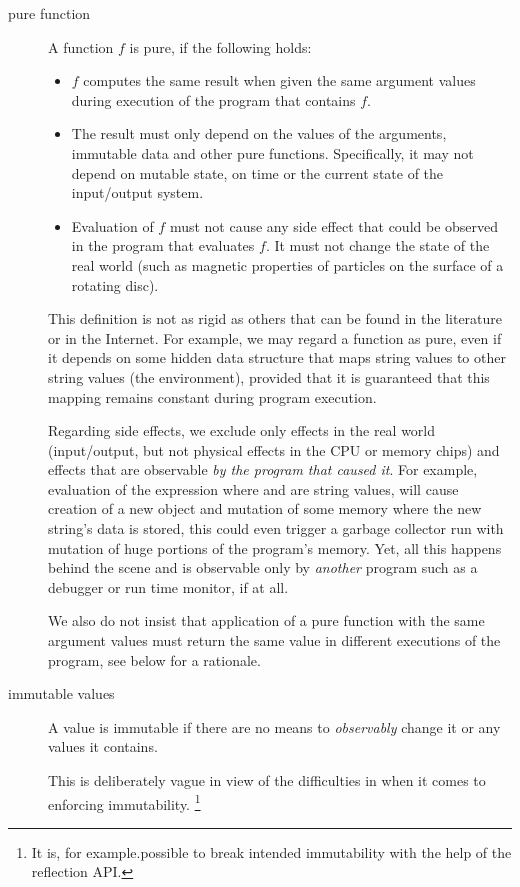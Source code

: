\begin{description}
\item[pure function] A function $f$ is pure, if the following holds:
\begin{itemize}
\item $f$ computes the same result when given the same argument values during execution of the program that contains $f$.
\item The result must only depend on the values of the arguments, immutable data and other pure functions. Specifically, it may not depend on mutable state, on time or the current state of the input/output system.
\item Evaluation of $f$ must not cause any side effect that could be observed in the program that evaluates $f$. It must not  change the state of the real world (such as magnetic properties of particles on the surface of a rotating disc).
\end{itemize}
This definition is not as rigid as others that can be found in the literature or in the Internet. For example, we may regard a function  as pure, even if it depends on some hidden data structure that maps string values to other string values (the environment), provided that it is guaranteed that this mapping remains constant during program execution. 

Regarding side effects, we exclude only effects in the real world (input/output, but not physical effects in the CPU or memory chips) and effects that are observable \emph{by the program that caused it}. For example, evaluation of the expression
where  and  are string values, will cause creation of a new \java{}  object and mutation of some memory where the new string's data is stored, this could even trigger a garbage collector run with mutation of huge portions of the program's memory. Yet, all this happens behind the scene and is observable only by \emph{another} program such as a debugger or run time monitor, if at all.

We also do not insist that application of a pure function with the same argument values must return the same value in different executions of the program, see below for a rationale.

\item[immutable values] A value is immutable if there are no means to \emph{observably} change it or any values it contains.

This is deliberately vague in view of the difficulties in \java{} when it comes to enforcing immutability. \footnote{It is, for example.possible to break intended immutability with the help of  the reflection API.}


\end{description}
